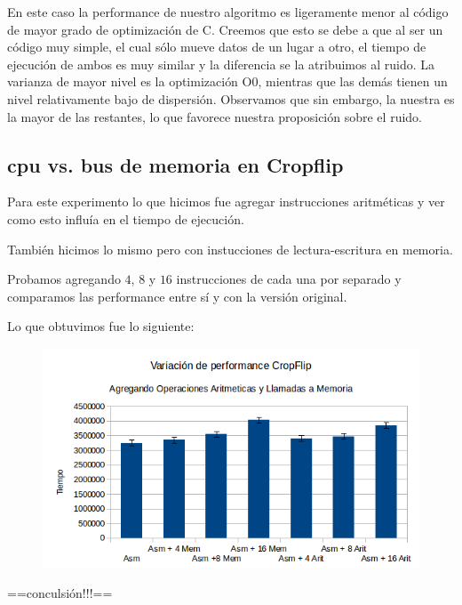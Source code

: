\documentclass[a4paper]{article}
\begin{document}
En este caso la performance de nuestro algoritmo es ligeramente menor al código de mayor grado de optimización de C. Creemos que esto se debe a que al ser un código muy simple, el cual sólo mueve datos de un lugar a otro, el tiempo de ejecución de ambos es muy similar y la diferencia se la atribuimos al ruido. La varianza de mayor nivel es la optimización O0, mientras que las demás tienen un nivel relativamente bajo de dispersión. Observamos que sin embargo, la nuestra es la mayor de las restantes, lo que favorece nuestra proposición sobre el ruido.

\newpage

\subsection{cpu vs. bus de memoria en Cropflip}

Para este experimento lo que hicimos fue agregar instrucciones aritméticas y ver como esto influía en el tiempo de ejecución.

También hicimos lo mismo pero con instucciones de lectura-escritura en memoria. 

Probamos agregando $4$, $8$ y $16$ instrucciones de cada una por separado y comparamos las performance entre sí y con la versión original.

Lo que obtuvimos fue lo siguiente:

\begin{figure}[h!]
  \begin{center}
  \includegraphics[scale=0.66]{Graficos1.5/crop/per.png}
  \label{nombreparareferenciar1}
  \end{center}
\end{figure}

==conculsión!!!==

\newpage
\end{document}
